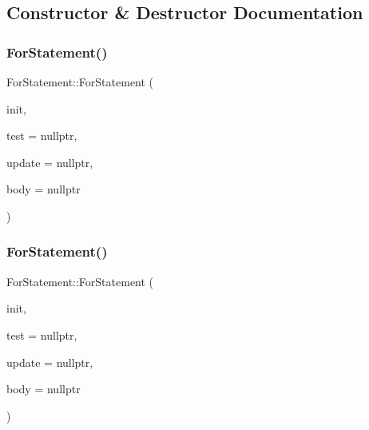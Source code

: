 \subsection{Constructor \& Destructor Documentation}
\mbox{\label{struct_for_statement_ac6f0bfa1c5a48bcf2ed048639e13cd16}} 
\subsubsection{\texorpdfstring{For\+Statement()}{ForStatement()}\hspace{0.1cm}{\footnotesize\ttfamily [1/2]}}
{\footnotesize\ttfamily For\+Statement\+::\+For\+Statement (\begin{DoxyParamCaption}\item[{\hyperlink{struct_variable_declaration_list}{Variable\+Declaration\+List} $\ast$}]{init,  }\item[{\hyperlink{struct_expression}{Expression} $\ast$}]{test = {\ttfamily nullptr},  }\item[{\hyperlink{struct_expression}{Expression} $\ast$}]{update = {\ttfamily nullptr},  }\item[{\hyperlink{struct_statement}{Statement} $\ast$}]{body = {\ttfamily nullptr} }\end{DoxyParamCaption})\hspace{0.3cm}{\ttfamily [inline]}}

\mbox{\label{struct_for_statement_af8cebdc0b96c9bb9bc7df08e273d3f81}} 
\subsubsection{\texorpdfstring{For\+Statement()}{ForStatement()}\hspace{0.1cm}{\footnotesize\ttfamily [2/2]}}
{\footnotesize\ttfamily For\+Statement\+::\+For\+Statement (\begin{DoxyParamCaption}\item[{\hyperlink{struct_expression}{Expression} $\ast$}]{init,  }\item[{\hyperlink{struct_expression}{Expression} $\ast$}]{test = {\ttfamily nullptr},  }\item[{\hyperlink{struct_expression}{Expression} $\ast$}]{update = {\ttfamily nullptr},  }\item[{\hyperlink{struct_statement}{Statement} $\ast$}]{body = {\ttfamily nullptr} }\end{DoxyParamCaption})\hspace{0.3cm}{\ttfamily [inline]}}



